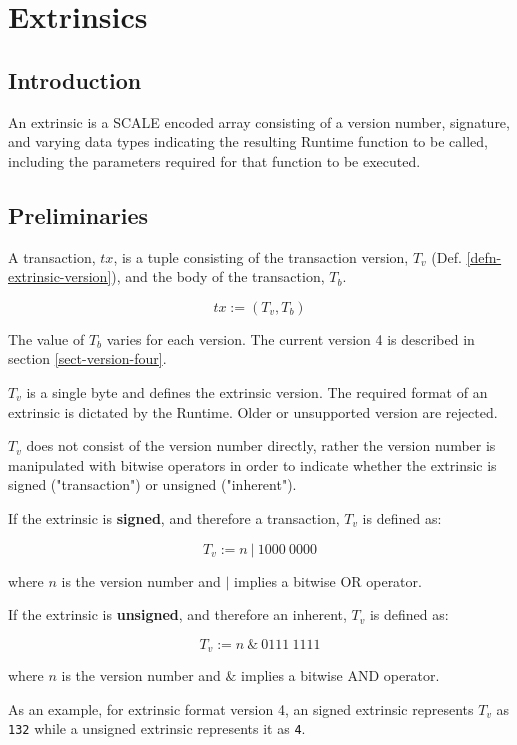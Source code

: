 \newpage
\chapter{Extrinsics}

\section{Introduction}

An extrinsic is a SCALE encoded array consisting of a version number,
signature, and varying data types indicating the resulting Runtime function to
be called, including the parameters required for that function to be executed.
\newline

\section{Preliminaries}

\begin{definition}
    A transaction, $tx$, is a tuple consisting of the transaction version,
    $T_v$ (Def. \ref{defn-extrinsic-version}), and the body of the transaction, $T_b$.

    \[
        tx := (T_v, T_b)
    \]

    The value of $T_b$ varies for each version. The current version 4 is
    described in section \ref{sect-version-four}.
\end{definition}

\begin{definition}
    \label{defn-extrinsic-version}
    $T_v$ is a single byte and defines the extrinsic version. The required
    format of an extrinsic is dictated by the Runtime. Older or unsupported
    version are rejected.
    \newline

    $T_v$ does not consist of the version number directly, rather the version
    number is manipulated with bitwise operators in order to indicate whether
    the extrinsic is signed ("transaction") or unsigned ("inherent").
    \newline

    If the extrinsic is \textbf{signed}, and therefore a transaction, $T_v$ is
    defined as:

    \[
        T_v := n \ | \ 1000 \ 0000
    \]

    where $n$ is the version number and $|$ implies a bitwise OR operator.
    \newline
    \newpage

    If the extrinsic is \textbf{unsigned}, and therefore an inherent, $T_v$ is
    defined as:

    \[
        T_v := n \ \& \ 0111 \ 1111
    \]

    where $n$ is the version number and $\&$ implies a bitwise AND operator.
    \newline

    As an example, for extrinsic format version 4, an signed extrinsic
    represents $T_v$ as \verb|132| while a unsigned extrinsic represents it as
    \verb|4|.
\end{definition}

